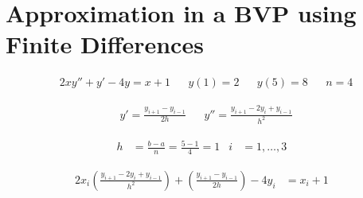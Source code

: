 \section{Approximation in a BVP using Finite Differences}

	\begin{align}
		&2xy'' + y' - 4y = x + 1&
		&y(1) = 2&
		&y(5) = 8&
		&n = 4&
	\end{align}

	\begin{align}
		&y' = \frac{y_{i+1} - y_{i-1}}{2h}&
		&y'' = \frac{y_{i+1} - 2y_{i} + y_{i-1}}{h^{2}}&
	\end{align}

	\begin{align}
		h &= \frac{b-a}{n} = \frac{5-1}{4} = 1&
		i &= 1,\dots,3&
	\end{align}

	\begin{align}
		2x_{i}
		\left(
			\frac{y_{i+1} - 2y_{i} + y_{i-1}}{h^{2}}
		\right)
		+
		\left(
			\frac{y_{i+1} - y_{i-1}}{2h}
		\right)
		- 4y_{i} &= x_{i} + 1&
	\end{align}

